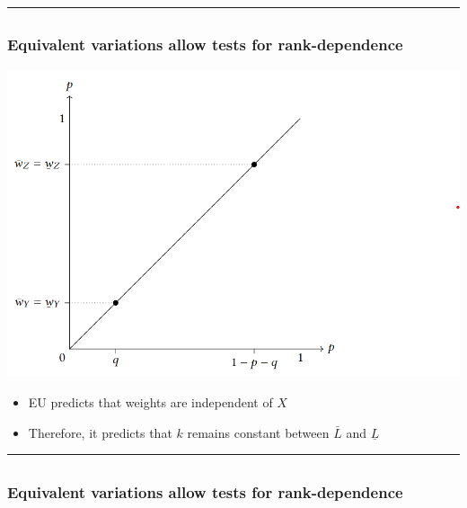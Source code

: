 \documentclass[
  letterpaper,
  DIV=11,
  numbers=noendperiod]{scrartcl}
\providecommand{\tightlist}{%
  \setlength{\itemsep}{0pt}\setlength{\parskip}{0pt}}\usepackage{longtable,booktabs,array}
\begin{document}
\begin{center}\rule{0.5\linewidth}{0.5pt}\end{center}

\subsection{}\label{section-18}

\subsubsection{Equivalent variations allow tests for
rank-dependence}\label{equivalent-variations-allow-tests-for-rank-dependence}

\includegraphics[width=1.4\linewidth,height=\textheight,keepaspectratio]{figures/EUWeights.png}

\begin{itemize}
\tightlist
\item
  EU predicts that weights are independent of \(X\)
\item
  Therefore, it predicts that \(k\) remains constant between \(\bar{L}\)
  and \(\underline{L}\)
\end{itemize}

\begin{center}\rule{0.5\linewidth}{0.5pt}\end{center}

\subsection{}\label{section-19}

\subsubsection{Equivalent variations allow tests for
rank-dependence}\label{equivalent-variations-allow-tests-for-rank-dependence-1}
\end{document}
